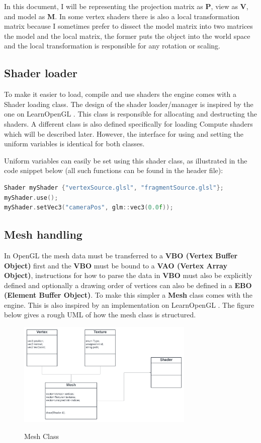 In this document, I will be representing the projection matrix as $\mathbf{P}$, view as $\mathbf{V}$, and model as $\mathbf{M}$. In some vertex shaders there is also a local transformation matrix because I sometimes prefer to dissect the model matrix into two matrices the model and the local matrix, the former puts the object into the world space and the local transformation is responsible for any rotation or scaling.

\subsection{Shader loader}
To make it easier to load, compile and use shaders the engine comes with a Shader loading
class. The design of the shader loader/manager is inspired by the one on LearnOpenGL \cite{learnopengl}. This class is responsible for allocating and destructing the shaders. A different class is also defined specifically for loading Compute shaders which will be described later. However, the interface for using and setting the uniform variables is identical for both classes.

Uniform variables can easily be set using this shader class, as illustrated in the code snippet below (all such functions can be found in the header file):
\begin{lstlisting}[language=C++]
Shader myShader {"vertexSource.glsl", "fragmentSource.glsl"};
myShader.use();
myShader.setVec3("cameraPos", glm::vec3(0.0f));
\end{lstlisting}

\subsection{Mesh handling}
\label{subsec:mesh_handling}
In OpenGL the mesh data must be transferred to a \textbf{VBO (Vertex Buffer Object)} first and the \textbf{VBO} must be bound to a \textbf{VAO (Vertex Array Object)}, instructions for how to parse the data in \textbf{VBO} must also be explicitly defined and optionally a drawing order of vertices can also be defined in a \textbf{EBO (Element Buffer Object)}. To make this simpler a \textbf{Mesh} class comes with the engine. This is also inspired by an implementation on LearnOpenGL \cite{learnopengl}. The figure below gives a rough UML of how the mesh class is structured.

\begin{figure}[H]
    \centering
    \includegraphics[width=0.75\textwidth]{images/mesh_uml.png}
    \caption{Mesh Class} \cite{learnopengl}
    \label{fig:mesh_uml}
\end{figure}


